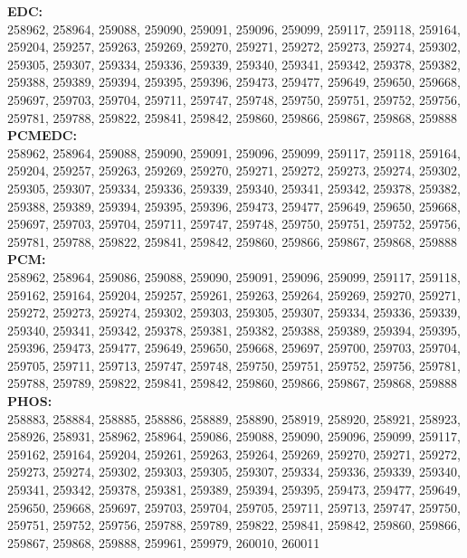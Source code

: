  \textbf{EDC:}\\
258962, 258964, 259088, 259090, 259091, 259096, 259099, 259117, 259118, 259164, 259204, 259257, 259263, 259269, 259270, 259271, 259272, 259273, 259274, 259302, 259305, 259307, 259334, 259336, 259339, 259340, 259341, 259342, 259378, 259382, 259388, 259389, 259394, 259395, 259396, 259473, 259477, 259649, 259650, 259668, 259697, 259703, 259704, 259711, 259747, 259748, 259750, 259751, 259752, 259756, 259781, 259788, 259822, 259841, 259842, 259860, 259866, 259867, 259868, 259888\\

 \textbf{PCMEDC:}\\
258962, 258964, 259088, 259090, 259091, 259096, 259099, 259117, 259118, 259164, 259204, 259257, 259263, 259269, 259270, 259271, 259272, 259273, 259274, 259302, 259305, 259307, 259334, 259336, 259339, 259340, 259341, 259342, 259378, 259382, 259388, 259389, 259394, 259395, 259396, 259473, 259477, 259649, 259650, 259668, 259697, 259703, 259704, 259711, 259747, 259748, 259750, 259751, 259752, 259756, 259781, 259788, 259822, 259841, 259842, 259860, 259866, 259867, 259868, 259888\\

 \textbf{PCM:}\\
258962, 258964, 259086, 259088, 259090, 259091, 259096, 259099, 259117, 259118, 259162, 259164, 259204, 259257, 259261, 259263, 259264, 259269, 259270, 259271, 259272, 259273, 259274, 259302, 259303, 259305, 259307, 259334, 259336, 259339, 259340, 259341, 259342, 259378, 259381, 259382, 259388, 259389, 259394, 259395, 259396, 259473, 259477, 259649, 259650, 259668, 259697, 259700, 259703, 259704, 259705, 259711, 259713, 259747, 259748, 259750, 259751, 259752, 259756, 259781, 259788, 259789, 259822, 259841, 259842, 259860, 259866, 259867, 259868, 259888\\

 \textbf{PHOS:}\\
258883, 258884, 258885, 258886, 258889, 258890, 258919, 258920, 258921, 258923, 258926, 258931, 258962, 258964, 259086, 259088, 259090, 259096, 259099, 259117, 259162, 259164, 259204, 259261, 259263, 259264, 259269, 259270, 259271, 259272, 259273, 259274, 259302, 259303, 259305, 259307, 259334, 259336, 259339, 259340, 259341, 259342, 259378, 259381, 259389, 259394, 259395, 259473, 259477, 259649, 259650, 259668, 259697, 259703, 259704, 259705, 259711, 259713, 259747, 259750, 259751, 259752, 259756, 259788, 259789, 259822, 259841, 259842, 259860, 259866, 259867, 259868, 259888, 259961, 259979, 260010, 260011\\

